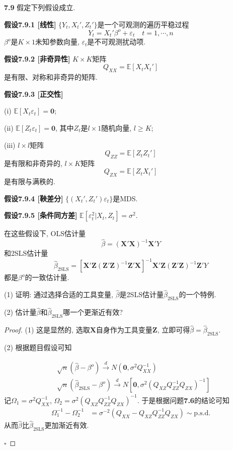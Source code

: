 \documentclass[cn,12pt,math=mtpro2,citestyle=gb7714-2015,bibstyle=gb7714-2015,twocol,mode=simple]{elegantbook}
\newcommand{\E}{\mathbb{E}}
\newcommand{\btls}{\hat{\beta}_{\text{2SLS}}}
\begin{document}
\textbf{7.9} 假定下列假设成立.

\textbf{假设7.9.1 [线性]} $\{Y_t, X_t', Z_t'\}$是一个可观测的遍历平稳过程
$$Y_t=X_t'\beta^o+\varepsilon_t\quad t=1,\cdots,n$$
$\beta^o$是$K\times 1$未知参数向量, $\varepsilon_t$是不可观测扰动项.

 \textbf{假设7.9.2 [非奇异性]} $K\times K$矩阵
 $$Q_{XX}=\E[X_tX_t']$$
 是有限、对称和非奇异的矩阵.

 \textbf{假设7.9.3 [正交性]}

 (i) $\E[X_t\varepsilon_t]=\mathbf{0}$;

 (ii) $\E[Z_t\varepsilon_t]=\mathbf{0}$, 其中$Z_t$是$l\times 1$随机向量, $l\geq K$;

 (iii) $l\times l$矩阵
 $$Q_{ZZ}=\E[Z_tZ_t']$$
 是有限和非奇异的, $l\times K$矩阵
 $$Q_{ZX}=\E[Z_tX_t']$$
 是有限与满秩的.

 \textbf{假设7.9.4 [鞅差分]} $\{(X_t',Z_t')\varepsilon_t\}$是MDS.

 \textbf{假设7.9.5 [条件同方差]} $\E[\varepsilon_t^2|X_t,Z_t]=\sigma^2$.

 在这些假设下, OLS估计量
 $$\hat{\beta}=(\mathbf{X}'\mathbf{X})^{-1}\mathbf{X}'Y$$
 和2SLS估计量
 $$\btls=[\mathbf{X}'\mathbf{Z}(\mathbf{Z}'\mathbf{Z})^{-1}\mathbf{Z}'\mathbf{X}]^{-1}\mathbf{X}'\mathbf{Z}(\mathbf{Z}'\mathbf{Z})^{-1}\mathbf{Z}'Y$$
 都是$\beta^o$的一致估计量.

 (1) 证明: 通过选择合适的工具变量, $\hat{\beta}$是2SLS估计量$\btls$的一个特例.

 (2) 估计量$\hat{\beta}$和$\btls$哪一个更渐近有效?

 \begin{proof}
   (1) 这是显然的, 选取$\mathbf{X}$自身作为工具变量$\mathbf{Z}$, 立即可得$\hat{\beta}=\btls$.

   (2) 根据题目假设可知

   \begin{align*}
   &\sqrt{n}(\hat{\beta}-\beta^o)\xrightarrow{d} N(\mathbf{0},\sigma^2Q_{XX}^{-1}) \\
   &\sqrt{n}(\btls-\beta^o)\xrightarrow{d} N[\mathbf{0},\sigma^2(Q_{XZ}Q_{ZZ}^{-1}Q_{ZX})^{-1}]
   \end{align*}
   记$\Omega_1=\sigma^2Q_{XX}^{-1}$, $\Omega_2=\sigma^2(Q_{XZ}Q_{ZZ}^{-1}Q_{ZX})^{-1}$. 于是根据问题\textbf{7.6}的结论可知
   \begin{align*}
   \Omega_1^{-1}-\Omega_2^{-1}&=\sigma^{-2}(Q_{XX}-Q_{XZ}Q_{ZZ}^{-1}Q_{ZX})\sim \text{p.s.d.}
   \end{align*}
   从而$\hat{\beta}$比$\btls$更加渐近有效.

   $\square$
 \end{proof}
\end{document}
